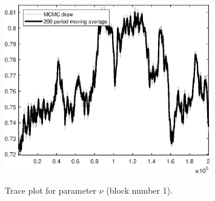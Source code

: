 \begin{figure}[H]
\centering
  \includegraphics[width=0.8\textwidth]{RBC_growth/graphs/TracePlot_nu_blck_1}\\
    \caption{Trace plot for parameter $\nu$ (block number 1).}
\end{figure}
